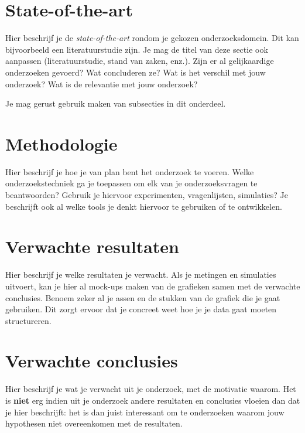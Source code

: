 
\section{State-of-the-art}
\label{sec:state-of-the-art}

Hier beschrijf je de \emph{state-of-the-art} rondom je gekozen onderzoeksdomein. Dit kan bijvoorbeeld een literatuurstudie zijn. Je mag de titel van deze sectie ook aanpassen (literatuurstudie, stand van zaken, enz.). Zijn er al gelijkaardige onderzoeken gevoerd? Wat concluderen ze? Wat is het verschil met jouw onderzoek? Wat is de relevantie met jouw onderzoek?


Je mag gerust gebruik maken van subsecties in dit onderdeel.

\section{Methodologie}
\label{sec:methodologie}

Hier beschrijf je hoe je van plan bent het onderzoek te voeren. Welke onderzoekstechniek ga je toepassen om elk van je onderzoeksvragen te beantwoorden? Gebruik je hiervoor experimenten, vragenlijsten, simulaties? Je beschrijft ook al welke tools je denkt hiervoor te gebruiken of te ontwikkelen.

\section{Verwachte resultaten}
\label{sec:verwachte_resultaten}

Hier beschrijf je welke resultaten je verwacht. Als je metingen en simulaties uitvoert, kan je hier al mock-ups maken van de grafieken samen met de verwachte conclusies. Benoem zeker al je assen en de stukken van de grafiek die je gaat gebruiken. Dit zorgt ervoor dat je concreet weet hoe je je data gaat moeten structureren.

\section{Verwachte conclusies}
\label{sec:verwachte_conclusies}

Hier beschrijf je wat je verwacht uit je onderzoek, met de motivatie waarom. Het is \textbf{niet} erg indien uit je onderzoek andere resultaten en conclusies vloeien dan dat je hier beschrijft: het is dan juist interessant om te onderzoeken waarom jouw hypothesen niet overeenkomen met de resultaten.

